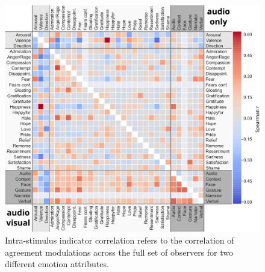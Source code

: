 \begin{figure}
  \centering
  \includegraphics[width=\linewidth]{figures/bigcorr}
  \caption{Intra-stimulus indicator correlation refers to the correlation of agreement modulations
    across the full set of observers for two different emotion attributes.
 }
  \label{fig:intrastimcorrelation}
\end{figure}

